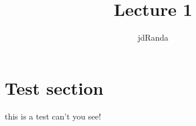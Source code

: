 \documentclass[10pt]{article}
\author{jdRanda}
\title{Lecture 1}
\begin{document}
    \section{Test section}
        this is a test can't you see!


    
\end{document}
